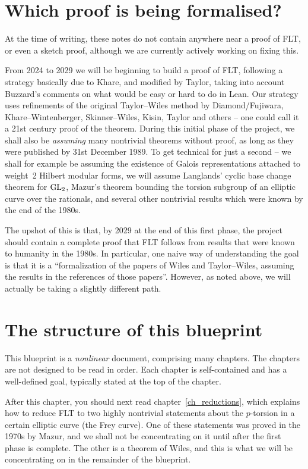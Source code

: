 \section{Which proof is being formalised?}

At the time of writing, these notes do not contain anywhere near a proof of FLT, or even a sketch proof,
although we are currently actively working on fixing this.

From 2024 to 2029 we will be beginning to build a proof of FLT, following a strategy
basically due to Khare, and modified by Taylor, taking into account Buzzard's comments on what
would be easy or hard to do
in Lean. Our strategy uses refinements of the original Taylor--Wiles method by Diamond/Fujiwara,
Khare--Wintenberger, Skinner--Wiles, Kisin, Taylor and others -- one could call it a 21st century
proof of the theorem. During this initial phase of the project, we shall also be \emph{assuming}
many nontrivial theorems without proof, as long as they were published by 31st December 1989.
To get technical for just a second -- we shall for example be assuming the existence of Galois
representations attached to weight~2 Hilbert modular forms, we will assume Langlands' cyclic base
change theorem for $\operatorname{GL}_2$, Mazur's theorem bounding the torsion subgroup of an elliptic curve over
the rationals, and several other nontrivial results which were known by the end of the 1980s.

The upshot of this is that, by 2029 at the end of this first phase, the project should contain a
complete proof that FLT follows from results that were known to humanity in the 1980s. In
particular, one naive way of understanding the goal is that it is a ``formalization of the papers
of Wiles and Taylor--Wiles, assuming the results in the references of those papers''. However,
as noted above, we will actually be taking a slightly different path.

\section{The structure of this blueprint}

This blueprint is a \emph{nonlinear} document, comprising many chapters. The chapters
are not designed to be read in order. Each chapter is self-contained and has a well-defined goal,
typically stated at the top of the chapter.

After this chapter, you should next read chapter~\ref{ch_reductions}, which explains how to reduce FLT
to two highly nontrivial statements about the $p$-torsion in a certain elliptic curve (the Frey curve).
One of these statements was proved in the 1970s by Mazur, and we shall not be concentrating on
it until after the first phase is complete. The other is a theorem of Wiles, and this is what we will
be concentrating on in the remainder of the blueprint.

